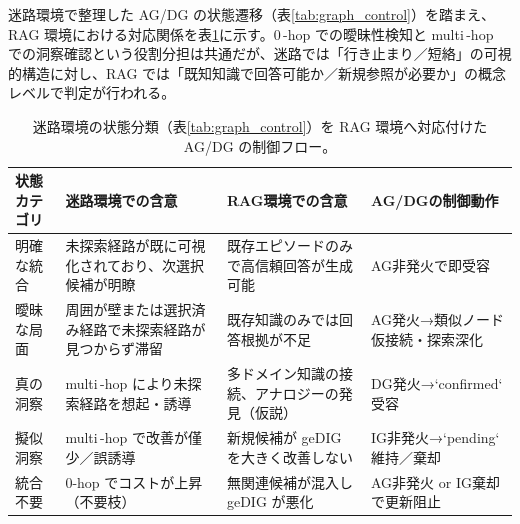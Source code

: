 \documentclass[ja=standard,xelatex]{bxjsarticle}
\begin{document}
\noindent 迷路環境で整理した AG/DG の状態遷移（表\ref{tab:graph_control}）を踏まえ、RAG 環境における対応関係を表\ref{tab:na_bt_rag_mapping}に示す。0\,\mbox{-}hop での曖昧性検知と multi\,\mbox{-}hop での洞察確認という役割分担は共通だが、迷路では「行き止まり／短絡」の可視的構造に対し、RAG では「既知知識で回答可能か／新規参照が必要か」の概念レベルで判定が行われる。

\begin{table}[H]
\centering
\renewcommand{\arraystretch}{1.15}
\scriptsize
\begin{tabular}{p{26mm}p{38mm}p{42mm}p{34mm}}
\toprule
状態カテゴリ & 迷路環境での含意 & RAG環境での含意 & AG/DGの制御動作 \\
\midrule
明確な統合 & 未探索経路が既に可視化されており、次選択候補が明瞭 & 既存エピソードのみで高信頼回答が生成可能 & AG非発火で即受容 \\
曖昧な局面 & 周囲が壁または選択済み経路で未探索経路が見つからず滞留 & 既存知識のみでは回答根拠が不足 & AG発火→類似ノード仮接続・探索深化 \\
真の洞察 & multi\,\mbox{-}hop により未探索経路を想起・誘導 & 多ドメイン知識の接続、アナロジーの発見（仮説） & DG発火→`confirmed` 受容 \\
擬似洞察 & multi\,\mbox{-}hop で改善が僅少／誤誘導 & 新規候補が geDIG を大きく改善しない & IG非発火→`pending` 維持／棄却 \\
統合不要 & 0-hop でコストが上昇（不要枝） & 無関連候補が混入し geDIG が悪化 & AG非発火 or IG棄却で更新阻止 \\
\bottomrule
\end{tabular}
\caption{迷路環境の状態分類（表\ref{tab:graph_control}）を RAG 環境へ対応付けた AG/DG の制御フロー。}
\label{tab:na_bt_rag_mapping}
\end{table}
\renewcommand{\arraystretch}{1.0}
\end{document}
